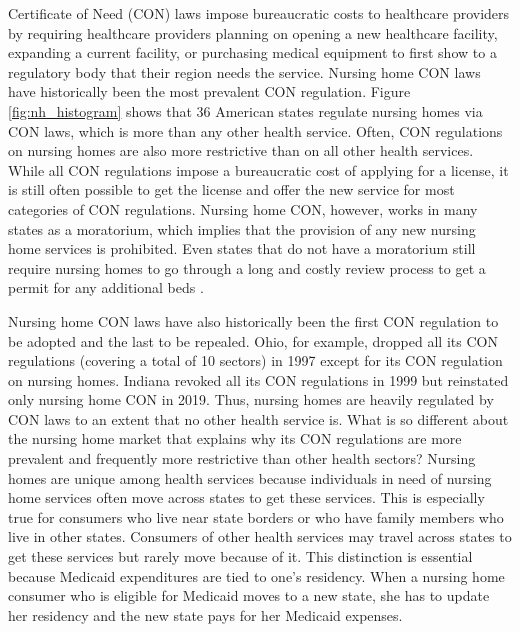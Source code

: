 \documentclass[../Main.tex]{subfiles}
\begin{document}
 Certificate of Need (CON) laws impose bureaucratic costs to healthcare providers by requiring healthcare providers planning on opening a new healthcare facility, expanding a current facility, or purchasing medical equipment to first show to a regulatory body that their region needs the service. Nursing home CON laws have historically been the most prevalent CON regulation. Figure \ref{fig:nh_histogram} shows that 36 American states regulate nursing homes via CON laws, which is more than any other health service. Often, CON regulations on nursing homes are also more restrictive than on all other health services. While all CON regulations impose a bureaucratic cost of applying for a license, it is still often possible to get the license and offer the new service for most categories of CON regulations. Nursing home CON, however, works in many states as a moratorium, which implies that the provision of any new nursing home services is prohibited. Even states that do not have a moratorium still require nursing homes to go through a long and costly review process to get a permit for any additional beds \citep{american2020american}. 
 
 Nursing home CON laws have also historically been the first CON regulation to be adopted and the last to be repealed. Ohio, for example, dropped all its CON regulations (covering a total of 10 sectors) in 1997 except for its CON regulation on nursing homes. Indiana revoked all its CON regulations in 1999 but reinstated only nursing home CON in 2019. Thus, nursing homes are heavily regulated by CON laws to an extent that no other health service is. What is so different about the nursing home market that explains why its CON regulations are more prevalent and frequently more restrictive than other health sectors? Nursing homes are unique among health services because individuals in need of nursing home services often move across states to get these services. This is especially true for consumers who live near state borders or who have family members who live in other states. Consumers of other health services may travel across states to get these services but rarely move because of it. This distinction is essential because Medicaid expenditures are tied to one's residency. When a nursing home consumer who is eligible for Medicaid moves to a new state, she has to update her residency and the new state pays for her Medicaid expenses.  
 
\end{document}
